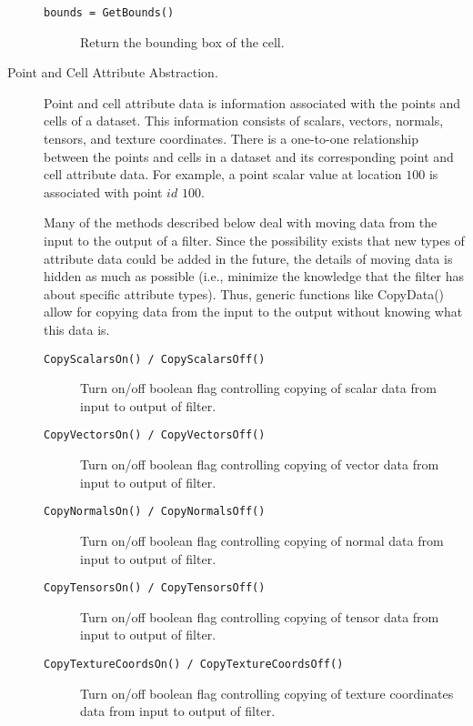 \begin{description}
\begin{description}
    \item[\texttt{bounds = GetBounds()}]
    Return the bounding box of the cell.

    \end{description}

\item[Point and Cell Attribute Abstraction.\index{abstraction!dataset attribute|(}\index{dataset attribute!abstraction|(}] Point and cell attribute data is information associated with the points and cells of a dataset. This information consists of scalars, vectors, normals, tensors, and texture coordinates. There is a one-to-one relationship between the points and cells in a dataset and its corresponding point and cell attribute data. For example, a point scalar value at location $100$ is associated with point $id$ $100$.

Many of the methods described below deal with moving data from the input to the output of a filter. Since the possibility exists that new types of attribute data could be added in the future, the details of moving data is hidden as much as possible (i.e., minimize the knowledge that the filter has about specific attribute types). Thus, generic functions like CopyData() allow for copying data from the input to the output without knowing what this data is.
    \begin{description}

    \item[\texttt{CopyScalarsOn() / CopyScalarsOff()}]
    Turn on/off boolean flag controlling copying of scalar data from input to output of filter.

    \item[\texttt{CopyVectorsOn() / CopyVectorsOff()}]
    Turn on/off boolean flag controlling copying of vector data from input to output of filter.

    \item[\texttt{CopyNormalsOn() / CopyNormalsOff()}]
    Turn on/off boolean flag controlling copying of normal data from input to output of filter.

    \item[\texttt{CopyTensorsOn() / CopyTensorsOff()}]
    Turn on/off boolean flag controlling copying of tensor data from input to output of filter.

    \item[\texttt{CopyTextureCoordsOn() / CopyTextureCoordsOff()}]
    Turn on/off boolean flag controlling copying of texture coordinates data from input to output of filter.


\end{description}
\end{description}
